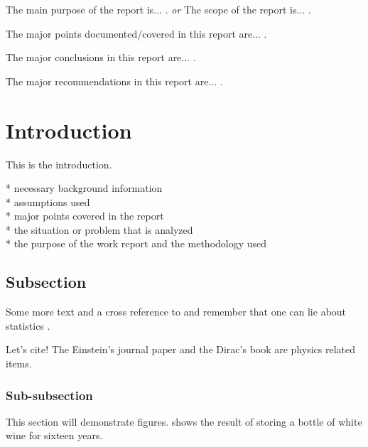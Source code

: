 \documentclass{wkrpt}
\begin{document}
\summary

The main purpose of the report is... .  \emph{or}  The scope of the report is... .

The major points documented/covered in this report are... .

The major conclusions in this report are... .

The major recommendations in this report are... .


\body

\section{Introduction}

This is the introduction.

* necessary background information\\
* assumptions used\\
* major points covered in the report\\
* the situation or problem that is analyzed\\
* the purpose of the work report and the methodology used\\

\subsection{Subsection}

Some more text and a cross reference to  and remember that one can lie about statistics .

Let's cite! The Einstein's journal paper  and the Dirac's book  are physics related items. 

\subsubsection{Sub-subsection}

This section will demonstrate figures.   shows the result of storing a bottle of white wine for sixteen years.
\end{document}
